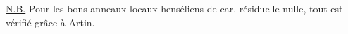 
\uline{N.B.} Pour les bons anneaux locaux
henséliens de  car. résiduelle nulle, tout
est vérifié grâce à Artin.


